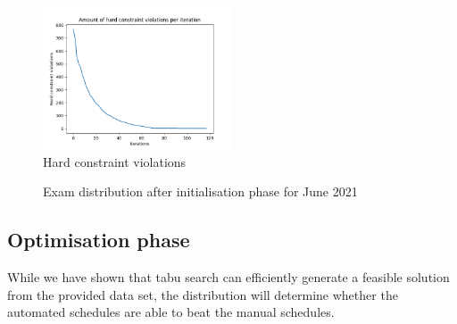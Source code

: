 \begin{figure}[h]
	\centering
	\includegraphics[width=0.5\textwidth]{images/init/conflicts.png} 
	\caption{Hard constraint violations}
	\label{fig:violations}
\end{figure}
\begin{figure}[h]
  \centering
  \hfill
  \caption{Exam distribution after initialisation phase for June 2021}
  \label{fig:init}
\end{figure}

\subsection{Optimisation phase}

While we have shown that tabu search can efficiently generate a feasible solution from the provided data set, the distribution will determine whether the automated schedules are able to beat the manual schedules. 

